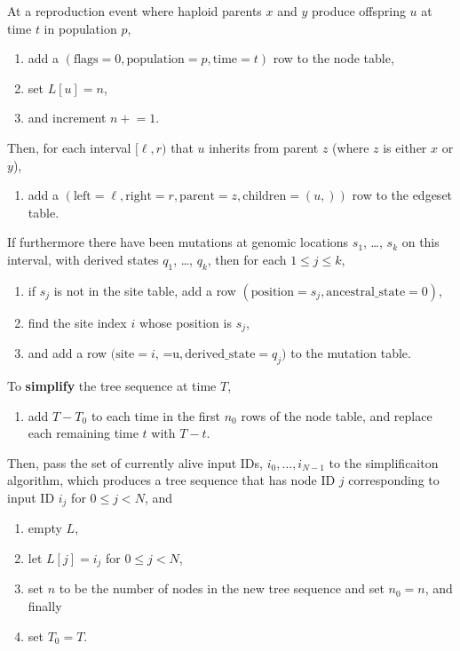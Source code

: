 \documentclass{article}
\begin{document}
At a reproduction event where haploid parents $x$ and $y$ produce offspring $u$ 
at time $t$ in population $p$,
\begin{enumerate}
    \item add a 
        $(
        \text{flags}=0,
        \text{population}=p, 
        \text{time}=t)$ row to the node table,
    \item set $L[u] = n$,
    \item and increment $n\mathrel{+}=1$.
\end{enumerate}
Then, for each interval $[\ell,r)$ that $u$ inherits from parent $z$
(where $z$ is either $x$ or $y$),
\begin{enumerate}[resume]
    \item add a 
        $( \text{left}=\ell,
        \text{right}=r, 
        \text{parent}=z, 
        \text{children}=(u,))$ row to the edgeset table.
\end{enumerate}
If furthermore there have been mutations at genomic locations $s_1$, \ldots, $s_k$
on this interval,
with derived states $q_1$, \ldots, $q_k$,
then for each $1 \le j \le k$,
\begin{enumerate}[resume]
    \item if $s_j$ is not in the site table, add a row
        $( \text{position}=s_j,
        \text{ancestral\_state}=0)$,
    \item find the site index $i$ whose position is $s_j$,
    \item and add a row
        $( \text{site}=i$,
           =u$,
        \text{derived\_state}=q_j)$ to the mutation table.
\end{enumerate}

To \textbf{simplify} the tree sequence at time $T$,
\begin{enumerate}
    \item add $T-T_0$ to each time in the first $n_0$ rows of the node table,
        and replace each remaining time $t$ with $T-t$.
\end{enumerate}
Then, pass the set of currently alive input IDs,
$i_0, \ldots, i_{N-1}$ to the simplificaiton algorithm,
which produces a tree sequence that has node ID $j$ corresponding to input ID $i_j$
for $0 \le j < N$, and
\begin{enumerate}[resume]
    \item empty $L$,
    \item let $L[j] = i_j$ for $0 \le j < N$,
    \item set $n$ to be the number of nodes in the new tree sequence and set $n_0 = n$, and finally
    \item set $T_0 = T$.
\end{enumerate}
\end{document}
